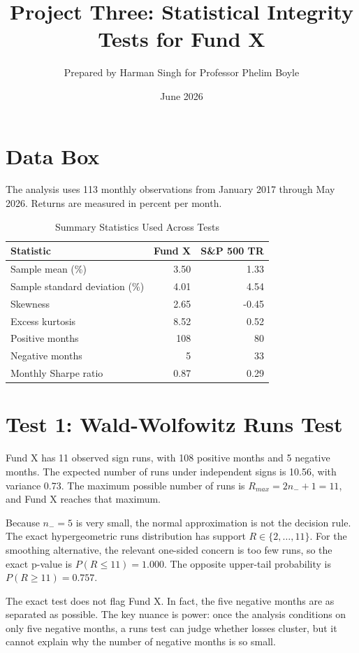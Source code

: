 \documentclass[11pt]{article}
\title{Project Three: Statistical Integrity Tests for Fund X}
\author{Prepared by Harman Singh for Professor Phelim Boyle}
\date{June 2026}
\begin{document}
\maketitle

\section*{Data Box}
The analysis uses 113 monthly observations from January 2017 through May 2026. Returns are measured in percent per month.

\begin{table}[H]
\centering
\caption{Summary Statistics Used Across Tests}
\begin{tabular}{lrr}
\toprule
Statistic & Fund X & S\&P 500 TR \\
\midrule
Sample mean (\%) & 3.50 & 1.33 \\
Sample standard deviation (\%) & 4.01 & 4.54 \\
Skewness & 2.65 & -0.45 \\
Excess kurtosis & 8.52 & 0.52 \\
Positive months & 108 & 80 \\
Negative months & 5 & 33 \\
Monthly Sharpe ratio & 0.87 & 0.29 \\
\bottomrule
\end{tabular}
\end{table}

\section*{Test 1: Wald-Wolfowitz Runs Test}
Fund X has 11 observed sign runs, with 108 positive months and 5 negative months.
The expected number of runs under independent signs is 10.56, with variance 0.73.
The maximum possible number of runs is $R_{max}=2n_-+1=11$, and Fund X reaches that maximum.

Because $n_-=5$ is very small, the normal approximation is not the decision rule.
The exact hypergeometric runs distribution has support $R\in\{2,\ldots,11\}$.
For the smoothing alternative, the relevant one-sided concern is too few runs, so the exact p-value is $P(R\leq 11)=1.000$.
The opposite upper-tail probability is $P(R\geq 11)=0.757$.

The exact test does not flag Fund X. In fact, the five negative months are as separated as possible.
The key nuance is power: once the analysis conditions on only five negative months, a runs test can judge whether losses cluster, but it cannot explain why the number of negative months is so small.
\end{document}
